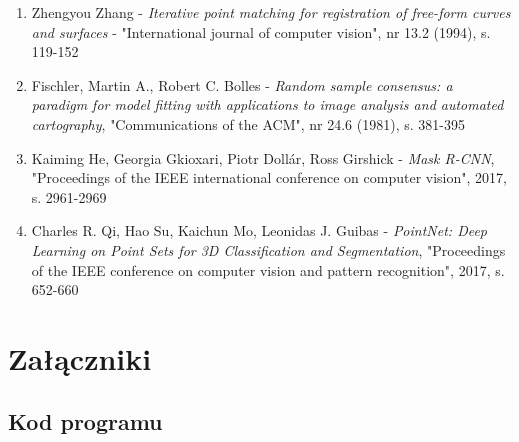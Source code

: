 \documentclass{article}
\begin{document}
\begin{enumerate}
\item Zhengyou Zhang - \emph{Iterative point matching for registration of free-form curves and surfaces} - "International journal of computer vision", nr 13.2 (1994), s. 119-152

\item Fischler, Martin A., Robert C. Bolles - \emph{Random sample consensus: a paradigm for model fitting with applications to image analysis and automated cartography}, "Communications of the ACM", nr 24.6 (1981), s. 381-395

\item Kaiming He, Georgia Gkioxari, Piotr Dollár, Ross Girshick - \emph{Mask R-CNN}, "Proceedings of the IEEE international conference on computer vision", 2017, s. 2961-2969

\item Charles R. Qi, Hao Su, Kaichun Mo, Leonidas J. Guibas - \emph{PointNet: Deep Learning on Point Sets for 3D Classification and Segmentation}, "Proceedings of the IEEE conference on computer vision and pattern recognition", 2017, s. 652-660
\end{enumerate}

\newpage
\section*{\LARGE{Załączniki}}
\subsection*{\Large{Kod programu}}

\end{document}
